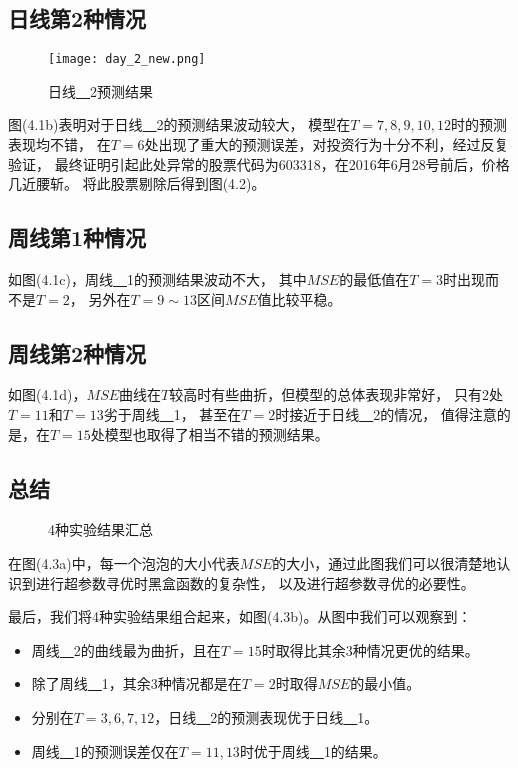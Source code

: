\subsection{日线第2种情况}

\begin{figure}[htb]
    \centering
    \caption{日线\underline{~~}2预测结果}
    \texttt{[image: day\_2\_new.png]}
\end{figure}

图(4.1b)表明对于日线\underline{~~}2的预测结果波动较大，
模型在$T=7,8,9,10,12$时的预测表现均不错，
在$T=6$处出现了重大的预测误差，对投资行为十分不利，经过反复验证，
最终证明引起此处异常的股票代码为603318，在2016年6月28号前后，价格几近腰斩。
将此股票剔除后得到图(4.2)。

\subsection{周线第1种情况}

如图(4.1c)，周线\underline{~~}1的预测结果波动不大，
其中$MSE$的最低值在$T=3$时出现而不是$T=2$，
另外在$T=9\sim13$区间$MSE$值比较平稳。

\subsection{周线第2种情况}

如图(4.1d)，$MSE$曲线在$T$较高时有些曲折，但模型的总体表现非常好，
只有2处$T=11$和$T=13$劣于周线\underline{~~}1，
甚至在$T=2$时接近于日线\underline{~~}2的情况，
值得注意的是，在$T=15$处模型也取得了相当不错的预测结果。

\subsection{总结}

\begin{figure}[ht]
    \centering
    \caption{4种实验结果汇总}
    \quad
\end{figure}

在图(4.3a)中，每一个泡泡的大小代表$MSE$的大小，通过此图我们可以很清楚地认识到进行超参数寻优时黑盒函数的复杂性，
以及进行超参数寻优的必要性。

最后，我们将4种实验结果组合起来，如图(4.3b)。从图中我们可以观察到：
\begin{itemize}
    \item 周线\underline{~~}2的曲线最为曲折，且在$T=15$时取得比其余3种情况更优的结果。
    \item 除了周线\underline{~~}1，其余3种情况都是在$T=2$时取得$MSE$的最小值。
    \item 分别在$T=3,6,7,12$，日线\underline{~~}2的预测表现优于日线\underline{~~}1。
    \item 周线\underline{~~}1的预测误差仅在$T=11,13$时优于周线\underline{~~}1的结果。
\end{itemize}

